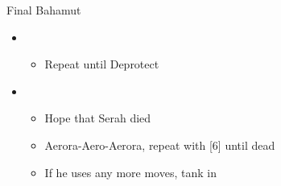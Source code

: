 \begin{battle}{Final Bahamut}
\begin{flushleft}
\begin{itemize}
	\item \third
	\begin{itemize}
		\item Repeat until Deprotect
	\end{itemize}
	\item \fifth
	\begin{itemize}
		\item Hope that Serah died
		\item Aerora-Aero-Aerora, repeat with [6] until dead
		\item If he uses any more moves, tank in \fourth
	\end{itemize}
\end{itemize}
\end{flushleft}
\end{battle}
	
